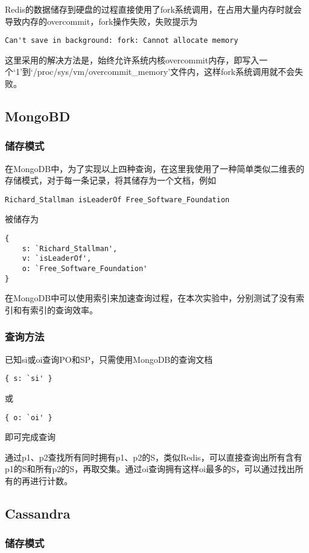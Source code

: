 \documentclass[12pt]{ctexart}
\begin{document}
Redis的数据储存到硬盘的过程直接使用了fork系统调用，在占用大量内存时就会导致内存的overcommit，fork操作失败，失败提示为
\begin{verbatim}
Can't save in background: fork: Cannot allocate memory
\end{verbatim}

这里采用的解决方法是，始终允许系统内核overcommit内存，即写入一个`1'到`/proc/sys/vm/overcommit\_memory'文件内，这样fork系统调用就不会失败。

\subsection{MongoBD}

\subsubsection{储存模式}

在MongoDB中，为了实现以上四种查询，在这里我使用了一种简单类似二维表的存储模式，对于每一条记录，将其储存为一个文档，例如
\begin{verbatim}
Richard_Stallman isLeaderOf Free_Software_Foundation
\end{verbatim}
被储存为
\begin{verbatim}
{
    s: `Richard_Stallman',
    v: `isLeaderOf',
    o: `Free_Software_Foundation'
}
\end{verbatim}
在MongoDB中可以使用索引来加速查询过程，在本次实验中，分别测试了没有索引和有索引的查询效率。

\subsubsection{查询方法}

已知si或oi查询PO和SP，只需使用MongoDB的查询文档
\begin{verbatim}{ s: `si' }\end{verbatim}
或
\begin{verbatim}{ o: `oi' }\end{verbatim}
即可完成查询

通过p1、p2查找所有同时拥有p1、p2的S，类似Redis，可以直接查询出所有含有p1的S和所有p2的S，再取交集。通过oi查询拥有这样oi最多的S，可以通过找出所有的再进行计数。

\subsection{Cassandra}

\subsubsection{储存模式}
\end{document}
